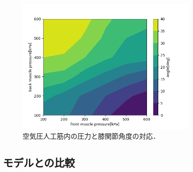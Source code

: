 \begin{figure}
\begin{minipage}[b]{.5\linewidth}
  \end{minipage}
  \begin{minipage}[b]{.5\linewidth}
   \centering
   \includegraphics[clip,width = 9cm]{./fig/r_knee_5deg.png}
  \end{minipage}
  \caption{空気圧人工筋内の圧力と膝関節角度の対応．\label{knee}}
 \end{figure}


\subsection{モデルとの比較}
